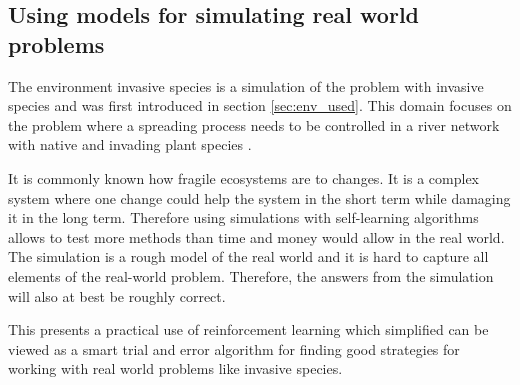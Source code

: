\subsection{Using models for simulating real world problems}
\label{sec:ethics_inv_spec}


The environment invasive species is a simulation of the problem with invasive
species and was first introduced in section \ref{sec:env_used}. This domain
focuses on the problem where a spreading process needs to be controlled in a
river network with native and invading plant species
\parencite{invasiveSpecis2014:Online}. 

It is commonly known how fragile ecosystems are to changes. It is a complex
system where one change could help the system in the short term while damaging it in the long
term. Therefore using simulations with self-learning algorithms allows to test
more methods than time and money would allow in the real world. The simulation is a rough model
of the real world and it is hard to capture all elements of the real-world
problem. Therefore, the answers from the simulation will also at best be roughly
correct.

This presents a practical use of reinforcement learning which simplified can be
viewed as a smart trial and error algorithm for finding good strategies for
working with real world problems like invasive species.
